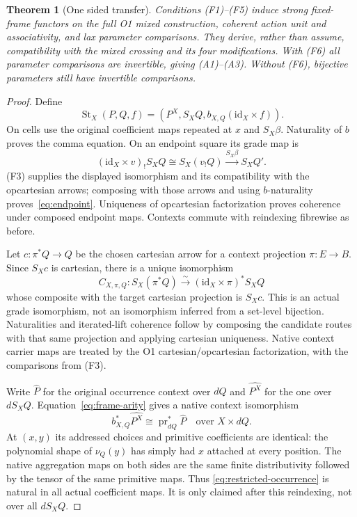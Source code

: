 \documentclass[11pt,a4paper]{article}
\newtheorem{theorem}{Theorem}[section]
\theoremstyle{definition}
\newcommand{\id}{\mathrm{id}}
\newcommand{\st}{\operatorname{St}}
\begin{document}
\begin{theorem}[One sided transfer]\label{thm:transfer}
Conditions \textup{(F1)--(F5)} induce strong fixed-frame functors on the full
O1 mixed construction, coherent action unit and associativity, and lax
parameter comparisons. They derive, rather than assume, compatibility with
the mixed crossing and its four modifications. With \textup{(F6)} all
parameter comparisons are invertible, giving \textup{(A1)--(A3)}. Without
\textup{(F6)}, bijective parameters still have invertible comparisons.
\end{theorem}
\begin{proof}
Define
\[
 \st_X(P,Q,f)=(P^X,S_XQ,b_{X,Q}(\id_X\times f)).
\]
On cells use the original coefficient maps repeated at $x$ and $S_X\beta$.
Naturality of $b$ proves the comma equation. On an endpoint square its grade
map is
\[
 (\id_X\times v)_!S_XQ\cong S_X(v_!Q)\xrightarrow{S_X\beta}S_XQ'.
\]
(F3) supplies the displayed isomorphism and its compatibility with the
opcartesian arrows; composing with those arrows and using $b$-naturality
proves~\eqref{eq:endpoint}. Uniqueness of opcartesian factorization proves
coherence under composed endpoint maps. Contexts commute with reindexing
fibrewise as before.

Let $c:\pi^*Q\to Q$ be the chosen cartesian arrow for a context projection
$\pi:E\to B$. Since $S_Xc$ is cartesian, there is a unique isomorphism
\begin{equation}\label{eq:cart-comparison}
 C_{X,\pi,Q}:S_X(\pi^*Q)\xrightarrow{\sim}
          (\id_X\times\pi)^*S_XQ
\end{equation}
whose composite with the target cartesian projection is $S_Xc$.
This is an actual grade isomorphism, not an isomorphism inferred from a
set-level bijection. Naturalities and iterated-lift coherence follow by
composing the candidate routes with that same projection and applying
cartesian uniqueness. Native context carrier maps are treated by the O1
cartesian/opcartesian factorization, with the comparisons from (F3).

Write $\widehat P$ for the original occurrence context over $dQ$ and
$\widehat{P^X}$ for the one over $dS_XQ$. Equation~\eqref{eq:frame-arity}
gives a native context isomorphism
\begin{equation}\label{eq:restricted-occurrence}
 b_{X,Q}^*\widehat{P^X}\cong\operatorname{pr}_{dQ}^*\widehat P
                 \quad\text{over }X\times dQ.
\end{equation}
At $(x,y)$ its addressed choices and primitive coefficients are identical:
the polynomial shape of $\nu_Q(y)$ has simply had $x$ attached at every
position. The native aggregation maps on both sides are the same finite
distributivity followed by the tensor of the same primitive maps. Thus
\eqref{eq:restricted-occurrence} is natural in all actual coefficient maps.
It is only claimed after this reindexing, not over all $dS_XQ$.


\end{proof}
\end{document}

